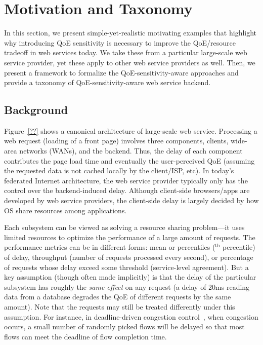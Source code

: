 \section{Motivation and Taxonomy}

In this section, we present simple-yet-realistic motivating examples that highlight why introducing QoE sensitivity is necessary to improve the QoE/resource tradeoff in web services today. 
We take these from a particular large-scale web service provider, yet these apply to other web service providers as well.
Then, we present a framework to formalize the QoE-sensitivity-aware approaches and provide a taxonomy of QoE-sensitivity-aware web service backend.

\subsection{Background}
Figure~\ref{??} shows a canonical architecture of large-scale web service. 
Processing a web request (\eg loading of a front page) involves three components, clients, wide-area networks (WANs), and the backend. 
Thus, the delay of each component contributes the page load time and eventually the user-perceived QoE (assuming the requested data is not cached locally by the client/ISP, etc). 
In today's federated Internet architecture, the web service provider typically only has the control over the backend-induced delay. Although client-side browsers/apps are developed by web service providers, the client-side delay is largely decided by how OS share resources among applications. 


Each subsystem can be viewed as solving a resource sharing problem---it uses limited resources to optimize the performance of a large amount of requests. 
The performance metrics can be in different forms: mean or percentiles ($^\textrm{th}$ percentile) of delay, throughput (number of requests processed every second), or percentage of requests whose delay exceed some threshold (\eg service-level agreement).
But a key assumption (though often made implicitly) is that the delay of the particular subsystem has roughly the {\em same effect} on any request (\eg a delay of 20ms reading data from a database degrades the QoE of different requests by the same amount). 
Note that the requests may still be treated differently under this assumption. For instance, in deadline-driven congestion control~\cite{??}, when congestion occurs, a small number of randomly picked flows will be delayed so that most flows can meet the deadline of flow completion time. 


